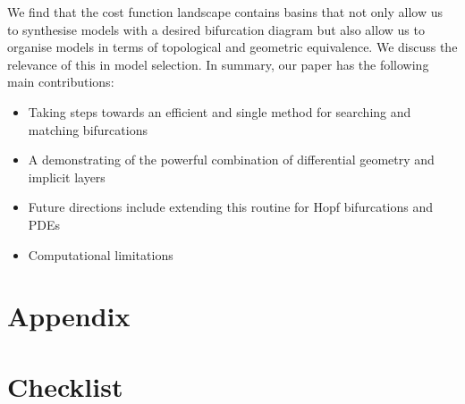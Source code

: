 We find that the cost function landscape contains basins that not only allow us to synthesise models with a desired bifurcation diagram but also allow us to organise models in terms of topological and geometric equivalence. We discuss the relevance of this in model selection. In summary, our paper has the following main contributions:

\begin{itemize}
    \item Taking steps towards an efficient and single method for searching and matching bifurcations
    \item A demonstrating of the powerful combination of differential geometry and implicit layers
    \item Future directions include extending this routine for Hopf bifurcations and PDEs
    \item Computational limitations
\end{itemize}

\clearpage



\clearpage
\section*{Appendix}
\appendix


\clearpage
\section*{Checklist}


